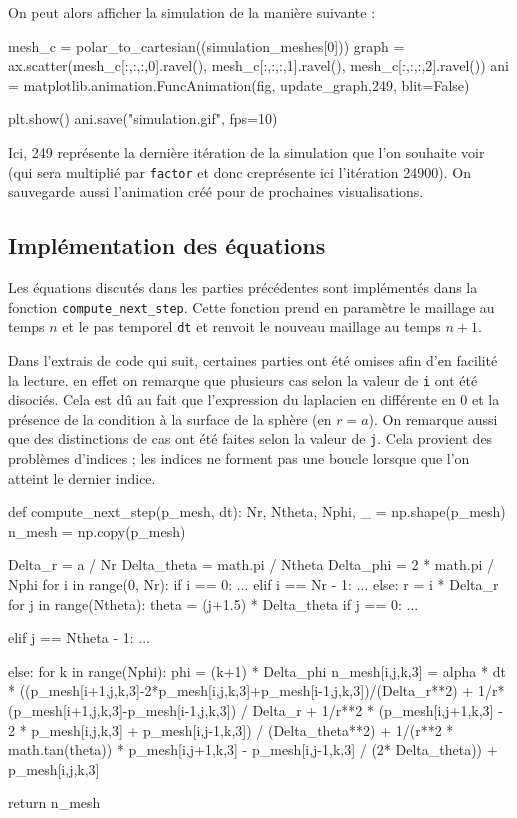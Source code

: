 \documentclass[fleqn]{article}
\begin{document}
On peut alors afficher la simulation de la manière suivante :
\begin{python}
    mesh_c = polar_to_cartesian((simulation_meshes[0]))
    graph = ax.scatter(mesh_c[:,:,:,0].ravel(), mesh_c[:,:,:,1].ravel(), mesh_c[:,:,:,2].ravel())
    ani = matplotlib.animation.FuncAnimation(fig, update_graph,249, blit=False)

    plt.show()
    ani.save("simulation.gif", fps=10)
\end{python}

Ici, 249 représente la dernière itération de la simulation que l'on souhaite voir (qui sera multiplié par \texttt{factor} et donc creprésente ici l'itération 24900). On sauvegarde aussi l'animation créé pour de prochaines visualisations.


\subsection{Implémentation des équations}
Les équations discutés dans les parties précédentes sont implémentés dans la fonction \texttt{compute\_next\_step}. Cette fonction prend en paramètre le maillage au temps $n$ et le pas temporel \texttt{dt} et renvoit le nouveau maillage au temps $n+1$.

Dans l'extrais de code qui suit, certaines parties ont été omises afin d'en facilité la lecture. en effet on remarque que plusieurs cas selon la valeur de \texttt{i} ont été disociés. Cela est dû au fait que l'expression du laplacien en différente en 0 et la présence de la condition à la surface de la sphère (en $r=a$). On remarque aussi que des distinctions de cas ont été faites selon la valeur de \texttt{j}. Cela provient des problèmes d'indices ; les indices ne forment pas une boucle lorsque que l'on atteint le dernier indice.

\newpage
\begin{python}
def compute_next_step(p_mesh, dt):
    Nr, Ntheta, Nphi, _ = np.shape(p_mesh)
    n_mesh = np.copy(p_mesh)

    Delta_r = a / Nr
    Delta_theta = math.pi / Ntheta
    Delta_phi = 2 * math.pi / Nphi
    for i in range(0, Nr):
        if i == 0:
            ...
        elif i == Nr - 1:
            ...     
        else:
            r = i * Delta_r
            for j in range(Ntheta):
                theta = (j+1.5) * Delta_theta
                if j == 0:
                    ...
                    
                elif j == Ntheta - 1:
                    ...
                                        
                else:
                    for k in range(Nphi):
                        phi = (k+1) * Delta_phi
                        n_mesh[i,j,k,3] = alpha * dt * 
                    ((p_mesh[i+1,j,k,3]-2*p_mesh[i,j,k,3]+p_mesh[i-1,j,k,3])/(Delta_r**2)
                    + 1/r*(p_mesh[i+1,j,k,3]-p_mesh[i-1,j,k,3]) / Delta_r
+ 1/r**2 * (p_mesh[i,j+1,k,3] - 2 * p_mesh[i,j,k,3] + p_mesh[i,j-1,k,3]) / (Delta_theta**2)
+ 1/(r**2 * math.tan(theta)) * p_mesh[i,j+1,k,3] - p_mesh[i,j-1,k,3] / (2* Delta_theta)) 
+ p_mesh[i,j,k,3]
                        
    return n_mesh
\end{python}
\end{document}
